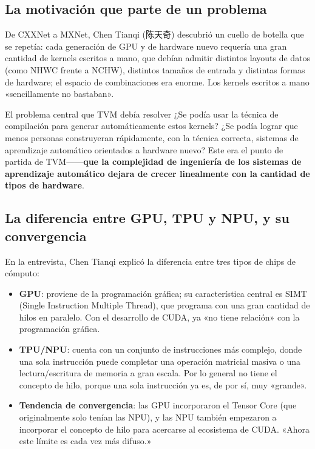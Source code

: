 \documentclass[a4paper]{article}
\begin{document}
\subsection{La motivación que parte de un problema}

De CXXNet a MXNet, Chen Tianqi (陈天奇) descubrió un cuello de botella que se repetía: cada generación de GPU y de hardware nuevo requería una gran cantidad de kernels escritos a mano, que debían admitir distintos layouts de datos (como NHWC frente a NCHW), distintos tamaños de entrada y distintas formas de hardware; el espacio de combinaciones era enorme. Los kernels escritos a mano «sencillamente no bastaban».

\begin{importantbox}{El problema central que TVM debía resolver}
¿Se podía usar la técnica de compilación para generar automáticamente estos kernels? ¿Se podía lograr que menos personas construyeran rápidamente, con la técnica correcta, sistemas de aprendizaje automático orientados a hardware nuevo? Este era el punto de partida de TVM------\textbf{que la complejidad de ingeniería de los sistemas de aprendizaje automático dejara de crecer linealmente con la cantidad de tipos de hardware}.
\end{importantbox}

\subsection{La diferencia entre GPU, TPU y NPU, y su convergencia}

En la entrevista, Chen Tianqi explicó la diferencia entre tres tipos de chips de cómputo:

\begin{itemize}
    \item \textbf{GPU}: proviene de la programación gráfica; su característica central es SIMT (Single Instruction Multiple Thread), que programa con una gran cantidad de hilos en paralelo. Con el desarrollo de CUDA, ya «no tiene relación» con la programación gráfica.
    \item \textbf{TPU/NPU}: cuenta con un conjunto de instrucciones más complejo, donde una sola instrucción puede completar una operación matricial masiva o una lectura/escritura de memoria a gran escala. Por lo general no tiene el concepto de hilo, porque una sola instrucción ya es, de por sí, muy «grande».
    \item \textbf{Tendencia de convergencia}: las GPU incorporaron el Tensor Core (que originalmente solo tenían las NPU), y las NPU también empezaron a incorporar el concepto de hilo para acercarse al ecosistema de CUDA. «Ahora este límite es cada vez más difuso.»
\end{itemize}
\end{document}
